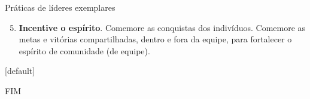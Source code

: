 \documentclass{beamer}
\begin{document}
\begin{frame}{Práticas de líderes exemplares}
	\begin{enumerate}
		\setcounter{enumi}{4}
		\justifying
		\item \textbf{Incentive o espírito}. Comemore as conquistas dos indivíduos. Comemore as metas e vitórias compartilhadas, dentro e fora da equipe, para fortalecer o espírito de comunidade (de equipe).
	\end{enumerate}
\end{frame}

[default]



\begin{frame}
    \centering
    \Large
    FIM
\end{frame}
    
\end{document}
